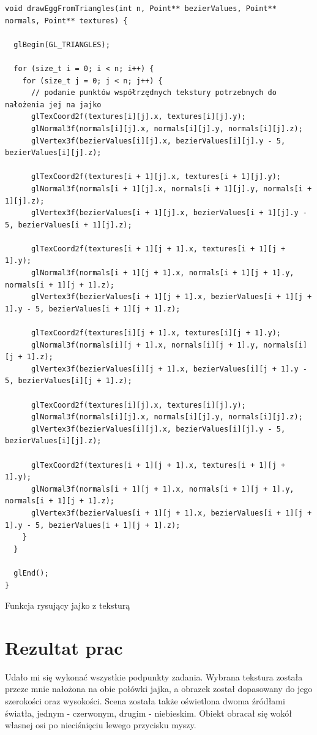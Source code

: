 \documentclass[12pt,a4paper,titlepage]{article}
\newenvironment{longlisting}{}{}
\begin{document}
\newpage
\begin{longlisting}
\begin{verbatim}
void drawEggFromTriangles(int n, Point** bezierValues, Point** normals, Point** textures) {

  glBegin(GL_TRIANGLES);
  
  for (size_t i = 0; i < n; i++) {
    for (size_t j = 0; j < n; j++) {
      // podanie punktów współrzędnych tekstury potrzebnych do nałożenia jej na jajko
      glTexCoord2f(textures[i][j].x, textures[i][j].y);
      glNormal3f(normals[i][j].x, normals[i][j].y, normals[i][j].z);
      glVertex3f(bezierValues[i][j].x, bezierValues[i][j].y - 5, bezierValues[i][j].z);

      glTexCoord2f(textures[i + 1][j].x, textures[i + 1][j].y);
      glNormal3f(normals[i + 1][j].x, normals[i + 1][j].y, normals[i + 1][j].z);
      glVertex3f(bezierValues[i + 1][j].x, bezierValues[i + 1][j].y - 5, bezierValues[i + 1][j].z);

      glTexCoord2f(textures[i + 1][j + 1].x, textures[i + 1][j + 1].y);
      glNormal3f(normals[i + 1][j + 1].x, normals[i + 1][j + 1].y, normals[i + 1][j + 1].z);
      glVertex3f(bezierValues[i + 1][j + 1].x, bezierValues[i + 1][j + 1].y - 5, bezierValues[i + 1][j + 1].z);

      glTexCoord2f(textures[i][j + 1].x, textures[i][j + 1].y);
      glNormal3f(normals[i][j + 1].x, normals[i][j + 1].y, normals[i][j + 1].z);
      glVertex3f(bezierValues[i][j + 1].x, bezierValues[i][j + 1].y - 5, bezierValues[i][j + 1].z);

      glTexCoord2f(textures[i][j].x, textures[i][j].y);
      glNormal3f(normals[i][j].x, normals[i][j].y, normals[i][j].z);
      glVertex3f(bezierValues[i][j].x, bezierValues[i][j].y - 5, bezierValues[i][j].z);

      glTexCoord2f(textures[i + 1][j + 1].x, textures[i + 1][j + 1].y);
      glNormal3f(normals[i + 1][j + 1].x, normals[i + 1][j + 1].y, normals[i + 1][j + 1].z);
      glVertex3f(bezierValues[i + 1][j + 1].x, bezierValues[i + 1][j + 1].y - 5, bezierValues[i + 1][j + 1].z);
    }
  }
  
  glEnd();
}
\end{verbatim}
\end{longlisting}
\begin{listing}
\caption{Funkcja rysujący jajko z teksturą}
\end{listing}

\section{Rezultat prac}
Udało mi się wykonać wszystkie podpunkty zadania. Wybrana tekstura została przeze mnie nałożona na obie połówki jajka, a obrazek został dopasowany do jego szerokości oraz wysokości. Scena została także oświetlona dwoma źródłami światła, jednym - czerwonym, drugim - niebieskim. Obiekt obracał się wokół własnej osi po nieciśnięciu lewego przycisku myszy.
\end{document}
